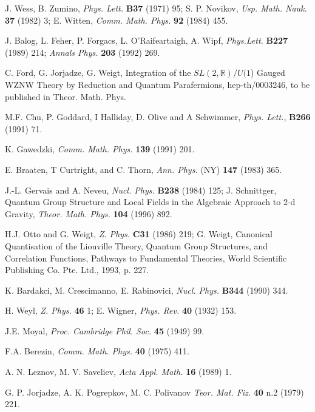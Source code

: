\documentclass[a4paper,12pt]{article}
\newcommand{\rr}{\mathbb{R}}
\begin{document}
\begin{thebibliography}{xx}
\frenchspacing

 J. Wess, B. Zumino, {\it Phys. Lett.} {\bf B37} (1971)
  95; S. P. Novikov, {\it Usp. Math. Nauk.} {\bf 37} (1982) 3; E.
  Witten, {\it Comm. Math. Phys.} {\bf 92} (1984) 455.

 J. Balog, L. Feher, P. Forgacs, L.
  O'Raifeartaigh, A.  Wipf, {\it Phys.Lett.} {\bf B227} (1989) 214;
  {\it Annals Phys.} {\bf 203} (1992) 269.

 C. Ford, G. Jorjadze, G. Weigt, Integration of the
  $SL(2,\rr)/U(1$) Gauged WZNW Theory by Reduction and Quantum
  Parafermions, hep-th/0003246, to be published in Theor. Math. Phys.

 M.F. Chu, P. Goddard, I Halliday, D. Olive and A
  Schwimmer, {\it Phys. Lett.}, {\bf B266} (1991) 71.

 K. Gawedzki, {\it Comm. Math. Phys.} {\bf
    139} (1991) 201.

 E. Braaten, T Curtright, and C. Thorn, {\it Ann.
    Phys.} (NY) {\bf 147} (1983) 365.

 J.-L. Gervais and A. Neveu, {\it Nucl. Phys.}{\bf
    B238} (1984) 125;  J. Schnittger,
  Quantum Group Structure and Local Fields in the Algebraic Approach
  to 2-d Gravity,  {\it Theor. Math.  Phys.} {\bf 104} (1996)
  892.

 H.J. Otto and G. Weigt, {\it Z. Phys.} {\bf C31} (1986)
  219; G. Weigt, Canonical Quantisation of the Liouville Theory,
  Quantum Group Structures, and Correlation Functions, Pathways to
  Fundamental Theories, World Scientific Publishing Co. Pte. Ltd.,
  1993, p. 227.

 K. Bardakci, M. Crescimanno, E. Rabinovici,
    {\it Nucl. Phys.} {\bf B344} (1990) 344.

 H. Weyl, {\it Z. Phys.} {\bf 46} 1; E. Wigner, {\it
    Phys. Rev.} {\bf 40} (1932) 153.

 J.E. Moyal, {\it Proc. Cambridge Phil. Soc.}  {\bf 45}
  (1949) 99.

 F.A. Berezin, {\it Comm. Math. Phys.} {\bf 40}
  (1975) 411.

 A. N. Leznov, M. V. Saveliev, {\it Acta Appl. Math.}
  {\bf 16} (1989) 1.

 G. P. Jorjadze, A. K. Pogrepkov, M. C. Polivanov {\it
    Teor. Mat. Fiz.} {\bf 40} n.2 (1979) 221.


\end{thebibliography}
\end{document}
